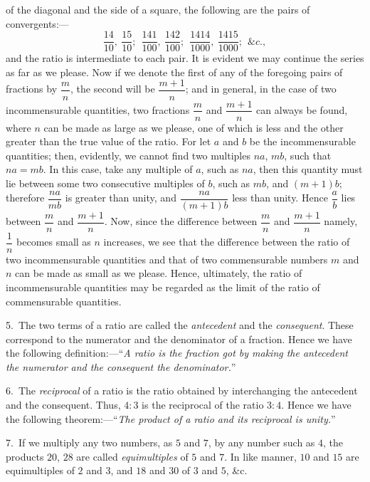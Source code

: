 \documentclass[oneside]{book}
\begin{document}
\begin{footnotesize}
of the diagonal and the side of a square, the following are the
pairs of convergents:---
\[
  \frac{14}{10},    \ \frac{15}{10};    \ \
  \frac{141}{100},  \ \frac{142}{100};  \ \
  \frac{1414}{1000},\ \frac{1415}{1000};\ \ \&c.,
\]
and the ratio is intermediate to each pair. It is evident we may
continue the series as far as we please. Now if we denote the
first of any of the foregoing pairs of fractions by $\dfrac{m}{n}$, the second
will be $\dfrac{m+1}{n}$; and in general, in the case of two incommensurable
quantities, two fractions $\dfrac{m}{n}$ and $\dfrac{m+1}{n}$ can always be
found, where $n$ can be made as large as we please, one of which
is less and the other greater than the true value of the ratio.
For let $a$ and $b$ be the incommensurable quantities; then, evidently,
we cannot find two multiples $na$, $mb$, such that $na = mb$.
In this case, take any multiple of $a$, such as $na$, then this quantity
must lie between some two consecutive multiples of $b$, such as $mb$,
and $(m + 1)b$; therefore $\dfrac{na}{mb}$ is greater than unity, and $\dfrac{na}{(m+1)b}$
less than unity. Hence $\dfrac{a}{b}$ lies between $\dfrac{m}{n}$ and $\dfrac{m+1}{n}$. Now,
since the difference between $\dfrac{m}{n}$ and $\dfrac{m+1}{n}$ namely, $\dfrac{1}{n}$ becomes
small as $n$ increases, we see that the difference between the ratio
of two incommensurable quantities and that of two commensurable
numbers $m$ and $n$ can be made as small as we please.
Hence, ultimately, the ratio of incommensurable quantities may
be regarded as the limit of the ratio of commensurable quantities.

5.~The two terms of a ratio are called the \emph{antecedent} and the
\emph{consequent}. These correspond to the numerator and the denominator
of a fraction. Hence we have the following definition:---``\emph{A
ratio is the fraction got by making the antecedent the numerator
and the consequent the denominator.}''

6.~The \emph{reciprocal} of a ratio is the ratio obtained by interchanging
the antecedent and the consequent. Thus, $4 : 3$ is the reciprocal
of the ratio $3 : 4$. Hence we have the following theorem:---``\emph{The
product of a ratio and its reciprocal is unity.}''

7.~If we multiply any two numbers, as $5$ and $7$, by any number
such as $4$, the products $20$, $28$ are called \emph{equimultiples} of $5$ and $7$.
In like manner, $10$ and $15$ are equimultiples of $2$ and $3$, and $18$
and $30$ of $3$ and $5$, \&c.
\par\end{footnotesize}
\end{document}
